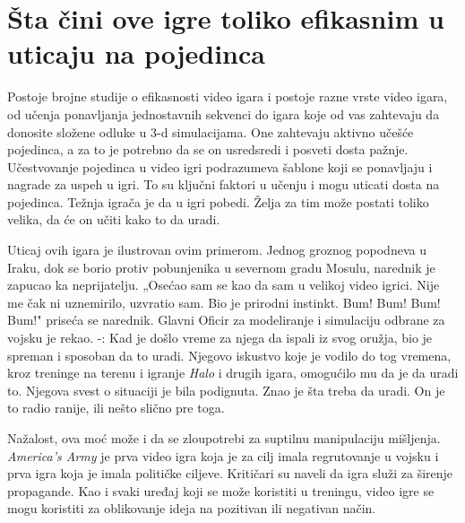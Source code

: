 \documentclass[a4paper]{article}
\begin{document}
\section{Šta čini ove igre toliko efikasnim u uticaju na pojedinca}
\label{sec:efikasno}
Postoje brojne studije o efikasnosti video igara i postoje razne
vrste video igara, od učenja ponavljanja jednostavnih sekvenci do igara koje od vas zahtevaju da donosite složene odluke u 3-d simulacijama. 
One zahtevaju aktivno učešće pojedinca, a za to je potrebno da se on usredsredi i posveti dosta pažnje. 
Učestvovanje pojedinca u video igri podrazumeva šablone koji se ponavljaju i nagrade za uspeh u igri. To su ključni
faktori u učenju i mogu uticati dosta na pojedinca. Težnja igrača je da u igri pobedi. Želja za tim može postati toliko velika, da će on učiti kako to da uradi.

Uticaj ovih igara je ilustrovan ovim primerom. Jednog groznog popodneva u
Iraku, dok se borio protiv pobunjenika u severnom gradu Mosulu, narednik je zapucao ka neprijatelju.
„Osećao sam se kao da sam u velikoj video igrici. Nije me čak ni uznemirilo, uzvratio sam.
Bio je prirodni instinkt. Bum! Bum! Bum! Bum!" priseća se narednik. Glavni
Oficir za modeliranje i simulaciju odbrane za vojsku je rekao. -: Kad je došlo vreme za njega
da ispali iz svog oružja, bio je spreman i sposoban da to uradi.
Njegovo iskustvo koje je vodilo do tog vremena, kroz treninge na terenu i igranje {\em Halo} i
drugih igara, omogućilo mu da je da uradi to. Njegova svest o situaciji je bila podignuta. Znao je šta treba da
uradi. On je to radio ranije, ili nešto slično pre toga.\cite{washingtonpost}

Nažalost, ova moć može i da se zloupotrebi za suptilnu manipulaciju mišljenja. {\em America's Army} je prva video igra koja je za cilj
imala regrutovanje u vojsku i prva igra koja je imala političke ciljeve. Kritičari su naveli da igra služi za širenje propagande. Kao i svaki uređaj koji se može koristiti u treningu, video igre se mogu koristiti za oblikovanje
ideja na pozitivan ili negativan način.\cite{wikipedia_american_army}
\end{document}
